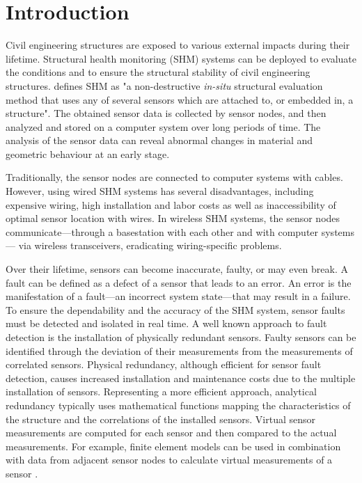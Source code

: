 \documentclass[12pt,a4paper]{scrartcl}
\begin{document}

\section*{Introduction}

Civil engineering structures are exposed to various external impacts during their lifetime. 
Structural health monitoring (SHM) systems can be deployed to evaluate the conditions and to ensure the structural stability of civil engineering structures.
\citet{BisbySHM} defines SHM as "a non-destructive \textit{in-situ} structural evaluation method that uses any of several sensors which are attached to, or embedded in, a structure".
The obtained sensor data is collected by sensor nodes, and then analyzed and stored on a computer system over long periods of time. 
The analysis of the sensor data can reveal abnormal changes in material and geometric behaviour at an early stage.

Traditionally, the sensor nodes are connected to computer systems with cables.
However, using wired SHM systems has several disadvantages, including expensive wiring, high installation and labor costs as well as inaccessibility of optimal sensor location with wires.
In wireless SHM systems, the sensor nodes communicate---through a basestation with each other and with computer systems--- via wireless transceivers, eradicating wiring-specific problems.

Over their lifetime, sensors can become inaccurate, faulty, or may even break.
A fault can be defined as a defect of a sensor that leads to an error. An error is the manifestation of a fault---an incorrect system state---that may result in a failure.
To ensure the dependability and the accuracy of the SHM system, sensor faults must be detected and isolated in real time. 
A well known approach to fault detection is the installation of physically redundant sensors.
Faulty sensors can be identified through the deviation of their measurements from the measurements of correlated sensors.
Physical redundancy, although efficient for sensor fault detection, causes increased installation and maintenance costs due to the multiple installation of sensors. 
Representing a more efficient approach, analytical redundancy typically uses mathematical functions mapping the characteristics of the structure and the correlations of the installed sensors. Virtual sensor measurements are computed for each sensor and then compared to the actual measurements. 
For example, finite element models can be used in combination with data from adjacent sensor nodes to calculate virtual measurements of a sensor
\citep{Smarsly2014}.
\end{document}
